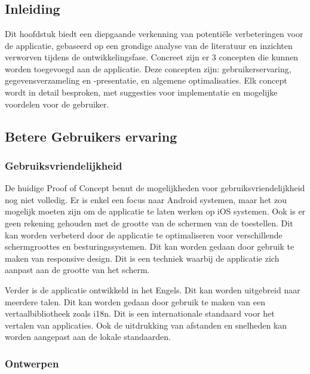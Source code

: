 \chapter{}%
\label{ch:verbeteringen}

\section{Inleiding}
Dit hoofdstuk biedt een diepgaande verkenning van potentiële verbeteringen voor de applicatie, gebaseerd op een grondige analyse van de literatuur en inzichten verworven tijdens de ontwikkelingsfase. Concreet zijn er 3 concepten die kunnen worden toegevoegd aan de applicatie. Deze concepten zijn: gebruikerservaring, gegevensverzameling en -presentatie, en algemene optimalisaties. Elk concept wordt in detail besproken, met suggesties voor implementatie en mogelijke voordelen voor de gebruiker.

\section{Betere Gebruikers ervaring}

\subsection{Gebruiksvriendelijkheid}

De huidige Proof of Concept benut de mogelijkheden voor gebruiksvriendelijkheid nog niet volledig. Er is enkel een focus naar Android systemen, maar het zou mogelijk moeten zijn om de applicatie te laten werken op iOS systemen. Ook is er geen rekening gehouden met de grootte van de schermen van de toestellen. Dit kan worden verbeterd door de applicatie te optimaliseren voor verschillende schermgroottes en besturingssystemen. Dit kan worden gedaan door gebruik te maken van responsive design. Dit is een techniek waarbij de applicatie zich aanpast aan de grootte van het scherm. 

\vspace{1cm}


Verder is de applicatie ontwikkeld in het Engels. Dit kan worden uitgebreid naar meerdere talen. Dit kan worden gedaan door gebruik te maken van een vertaalbibliotheek zoals i18n. Dit is een internationale standaard voor het vertalen van applicaties. Ook de uitdrukking van afstanden en snelheden kan worden aangepast aan de lokale standaarden.

\subsection{Ontwerpen}

